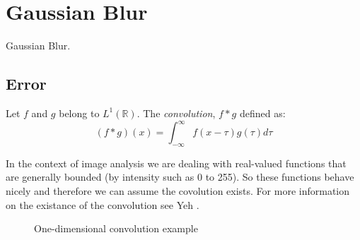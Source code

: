 \chapter{Gaussian Blur}
	Gaussian Blur.

\section{Error}

	\begin{dfn}
		Let $f$ and $g$ belong to $L^1(\mathbb{R})$. The \emph{convolution}, $f*g$ defined as:
		\begin{equation}\label{def_convolve_1D}
			(f*g)(x)=\int_{-\infty}^\infty f(x-\tau)g(\tau)d\tau
		\end{equation}
	\end{dfn}

	In the context of image analysis we are dealing with real-valued functions that are generally bounded (by intensity such as 0 to 255). So these functions behave nicely and therefore we can assume the covolution exists. For more information on the existance of the convolution see Yeh \cite{yeh_1}.

	\begin{figure}[!htb]
			\centering
			\caption{One-dimensional convolution example}
			\label{fig_convolution}
	\end{figure}
	\clearpage
	

